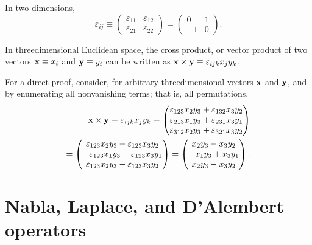 {
\color{blue}
\bexample

In two dimensions,
$$\varepsilon_{ij}\equiv
\left(
\begin{array}{rrrr}
\varepsilon_{11}&\varepsilon_{12}\\
\varepsilon_{21}&\varepsilon_{22}
\end{array}
\right)
=
\left(
\begin{array}{rrrr}
0&1\\
-1&0
\end{array}
\right)
.
$$
\eexample
}

In threedimensional Euclidean space,
the cross product, or vector product
of two vectors
${\bf x}\equiv x_i$
and
${\bf y}\equiv y_i$
can be written as
${\bf x} \times {\bf y}\equiv \varepsilon_{ijk}x_jy_k$.

{\color{OliveGreen}
\bproof
For a direct proof, consider, for arbitrary threedimensional vectors ${\bf x}$ and ${\bf y}$,
and by enumerating all nonvanishing terms; that is, all permutations,
\begin{equation}
\begin{split}
{\bf x} \times {\bf y}\equiv \varepsilon_{ijk}x_jy_k
\equiv
\begin{pmatrix}
\varepsilon_{123}x_2y_3 + \varepsilon_{132}x_3y_2 \\
\varepsilon_{213}x_1y_3 + \varepsilon_{231}x_3y_1 \\
\varepsilon_{312}x_2y_3 + \varepsilon_{321}x_3y_2
\end{pmatrix}   \\
=
\begin{pmatrix}
\varepsilon_{123}x_2y_3 - \varepsilon_{123}x_3y_2 \\
-\varepsilon_{123}x_1y_3 + \varepsilon_{123}x_3y_1 \\
\varepsilon_{123}x_2y_3 - \varepsilon_{123}x_3y_2
\end{pmatrix}
=
\begin{pmatrix}
x_2y_3 - x_3y_2 \\
-x_1y_3 + x_3y_1 \\
x_2y_3 - x_3y_2
\end{pmatrix}
.
\end{split}
\end{equation}
\eproof
}

\section{Nabla, Laplace, and D'Alembert operators}

